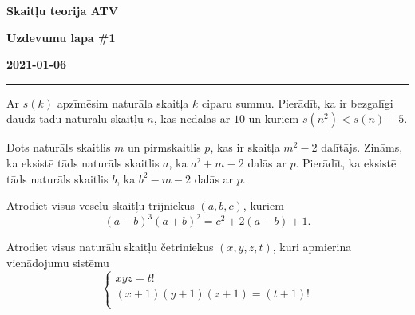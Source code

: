 \documentclass[a4paper,12pt]{article}
\begin{document}
\begin{center}
\parbox{3.5cm}{\flushleft\bf Skaitļu teorija \newline ATV} \hfill {\bf\LARGE Uzdevumu lapa \#1} \hfill \parbox{3.5cm}{\flushright\bf 2021-01-06} %
\end{center}

\hrule




\vspace{10pt}
\begin{problem}
Ar $s(k)$ apzīmēsim naturāla skaitļa $k$ ciparu summu. 
Pierādīt, ka ir bezgalīgi daudz tādu naturālu skaitļu $n$, kas nedalās ar $10$ un 
kuriem ${\displaystyle s(n^2) < s(n) -5}$. 
\end{problem}


\vspace{10pt}
\begin{problem} 
Dots naturāls skaitlis $m$ un pirmskaitlis $p$, kas ir skaitļa $m^2 - 2$ dalītājs. 
Zināms, ka eksistē tāds naturāls skaitlis $a$, ka $a^2 + m - 2$ dalās ar $p$. 
Pierādīt, ka eksistē tāds naturāls skaitlis $b$, ka $b^2 - m - 2$ 
dalās ar $p$. 
\end{problem}

\vspace{10pt}
\begin{problem}
Atrodiet visus veselu skaitļu trijniekus $(a,b,c)$, kuriem 
$$(a-b)^3(a+b)^2 = c^2 + 2(a - b) + 1.$$
\end{problem}





\vspace{10pt}
\begin{problem}
Atrodiet visus naturālu skaitļu četriniekus $(x,y,z,t)$, kuri apmierina vienādojumu sistēmu
$$\left\{ 
\begin{array}{l}
xyz = t!\\
(x+1)(y+1)(z+1) = (t+1)!\\
\end{array} 
\right.$$
\end{problem}
\end{document}
